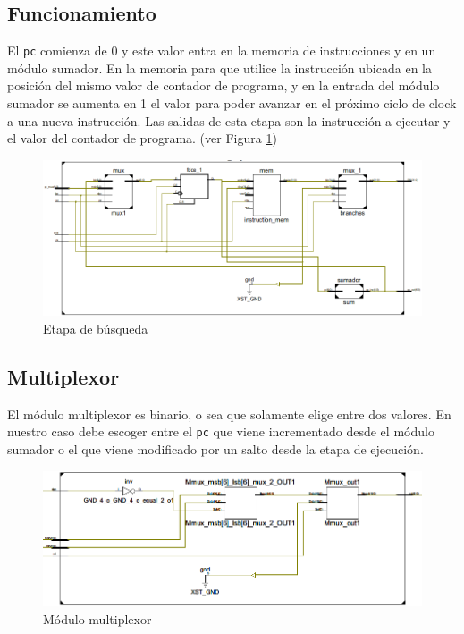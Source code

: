 \subsection{Funcionamiento}
El \texttt{pc} comienza de 0 y este valor entra en la memoria de instrucciones y en un m\'odulo sumador. En la memoria para que utilice la instrucci\'on ubicada en la posici\'on del mismo valor de contador de programa, y en la entrada del m\'odulo sumador se aumenta en 1 el valor para poder avanzar en el pr\'oximo ciclo de clock a una nueva instrucci\'on. Las salidas de esta etapa son la instrucci\'on a ejecutar y el valor del contador de programa.  (ver Figura \ref{fig:fetchzoom})

\begin{figure}[H]
\centering
\includegraphics[scale=0.35]{Capitulo01/etapafetchzoom}
\caption{Etapa de b\'usqueda}
\label{fig:fetchzoom}
\end{figure}

\subsection{Multiplexor}

El m\'odulo multiplexor es binario, o sea que solamente elige entre dos valores. En nuestro caso debe escoger entre el \texttt{pc} que viene incrementado desde el m\'odulo sumador o el que viene modificado por un salto desde la etapa de ejecuci\'on. 

\begin{figure}[H]
\centering
\includegraphics[scale=0.4]{Capitulo01/mux_fig.png}
\caption{M\'odulo multiplexor}
\label{fig:muxmodule}
\end{figure}


